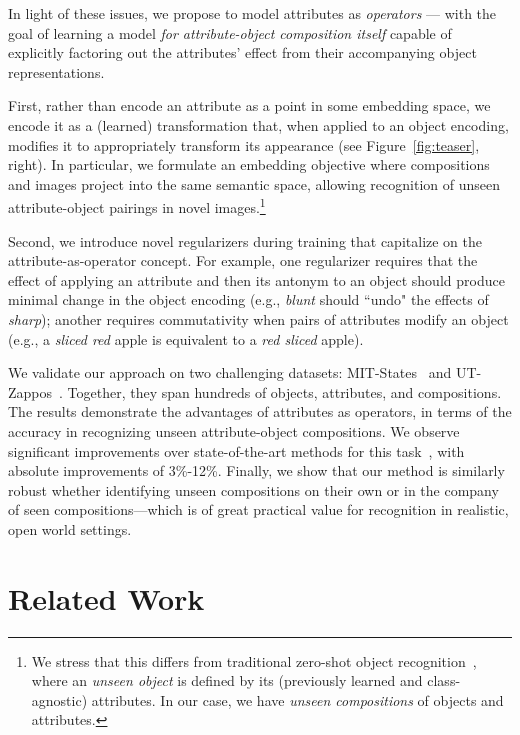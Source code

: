 \documentclass[runningheads]{llncs}
\begin{document}
In light of these issues, we propose to model attributes as \emph{operators} --- with the goal of learning a model \emph{for attribute-object composition itself} capable of explicitly factoring out the attributes' effect from their accompanying object representations.

First, rather than encode an attribute as a point in some embedding space, we encode it as a (learned) transformation that, when applied to an object encoding, modifies it to appropriately transform its appearance (see Figure~\ref{fig:teaser}, right).  
In particular, we formulate an embedding objective where compositions and images project into the same semantic space, allowing recognition of unseen attribute-object pairings in novel images.\footnote{We stress that this differs from traditional zero-shot object recognition~\cite{lampert-cvpr2009,dinesh-nips2014,ziad-cvpr2016}, where an \emph{unseen object} is defined by its (previously learned and class-agnostic) attributes.  In our case, we have \emph{unseen compositions} of objects and attributes.}

Second, we introduce novel regularizers during training that capitalize on the attribute-as-operator concept.  For example, one regularizer requires that the effect of applying an attribute and then its antonym to an object should produce minimal change in the object encoding (e.g., \emph{blunt} should ``undo" the effects of \emph{sharp}); another requires commutativity when pairs of attributes modify an object (e.g., a \emph{sliced red} apple is equivalent to a \emph{red sliced} apple). 

We validate our approach on two challenging datasets: MIT-States~\cite{misra2017red} and UT-Zappos~\cite{yu2014fine}.  Together, they span hundreds of objects, attributes, and compositions.
The results demonstrate the advantages of attributes as operators, in terms of the accuracy in recognizing unseen attribute-object compositions.  We observe significant improvements over state-of-the-art methods for this task~\cite{chen2014inferring,misra2017red}, with absolute improvements of 3\%-12\%. 
Finally, we show that our method is similarly robust whether identifying unseen compositions on their own or in the company of seen compositions---which is of great practical value for recognition in realistic, open world settings. \vspace*{-0.1in}
\section{Related Work}
\end{document}
